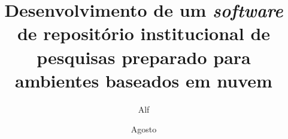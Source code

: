 \documentclass[diss]{template/setrem}
\title{Desenvolvimento de um \emph{software} de repositório institucional de pesquisas preparado para ambientes baseados em nuvem}
\author{Alf}{Lucas Machado}
\date{Agosto}{2022}
\begin{document}
\maketitle
% 











\begin{singlespaced}
    \listoftables
\end{singlespaced}


\end{document}
